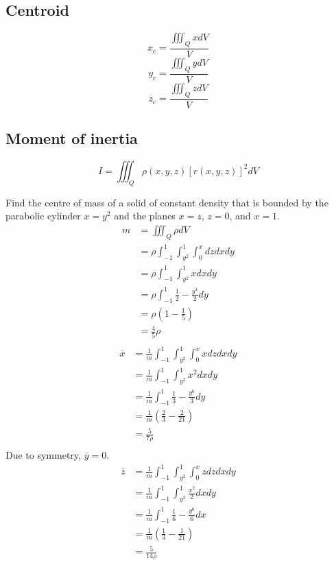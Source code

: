 \documentclass[12pt]{article}
\begin{document}
\subsection{Centroid}
$$x_c = \frac{\iiint_Q xdV}{V}$$
$$y_c = \frac{\iiint_Q ydV}{V}$$
$$z_c = \frac{\iiint_Q zdV}{V}$$

\subsection{Moment of inertia}
$$I = \iiint_Q \rho(x,y,z) [r(x,y,z)]^2 dV$$

\begin{ex}
	Find the centre of mass of a solid of constant density that is bounded by the parabolic cylinder $x=y^2$ and the planes $x=z$, $z=0$, and $x=1$.
	\begin{align*}
		m &= \iiint_Q \rho dV \\
		  &= \rho \int_{-1}^1 \int_{y^2}^1 \int_0^x dzdxdy \\
		  &= \rho \int_{-1}^1 \int_{y^2}^1 xdxdy \\
		  &= \rho \int_{-1}^1 \frac{1}{2} - \frac{y^4}{2} dy \\
		  &= \rho \left(1 - \frac{1}{5}\right) \\
		  &= \frac{4}{5}\rho \\
	\end{align*}
	\begin{align*}
		\overline{x} &= \frac{1}{m} \int_{-1}^1 \int_{y^2}^1 \int_0^x xdzdxdy \\
		  &= \frac{1}{m} \int_{-1}^1 \int_{y^2}^1 x^2 dxdy \\
		  &= \frac{1}{m} \int_{-1}^1 \frac{1}{3} - \frac{y^6}{3} dy \\
		  &= \frac{1}{m} \left( \frac{2}{3} - \frac{2}{21}\right) \\
		  &= \frac{5}{7\rho} \\
	\end{align*}
	Due to symmetry, $\overline{y}=0$.
	\begin{align*}
		\overline{z} &= \frac{1}{m} \int_{-1}^1 \int_{y^2}^1 \int_0^x zdzdxdy \\
			     &= \frac{1}{m} \int_{-1}^1 \int_{y^2}^1 \frac{x^2}{2} dxdy \\
			     &= \frac{1}{m} \int_{-1}^1 \frac{1}{6} - \frac{y^6}{6} dx \\
			     &= \frac{1}{m} \left(\frac{1}{3} - \frac{1}{21}\right) \\
			     &= \frac{5}{14\rho} \\
	\end{align*}
\end{ex}
\end{document}
